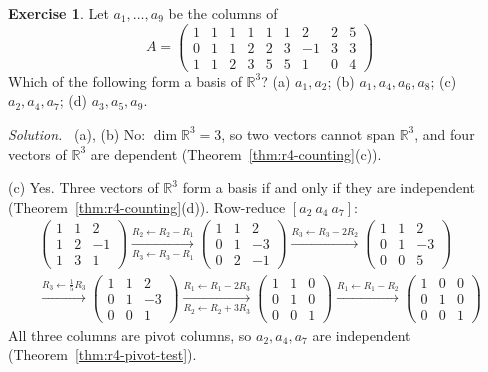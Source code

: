 \documentclass[12pt]{article}
\newcommand{\R}{\mathbb R}
\theoremstyle{definition}
\newtheorem{exercise}{Exercise}
\newenvironment{solution}{\par\noindent\textit{Solution.}\ }{\par\smallskip}
\begin{document}
\begin{exercise}\label{ex:r4-which-bases}
Let \(a_1,\dots,a_9\) be the columns of
\[
A=\begin{pmatrix}1&1&1&1&1&1&2&2&5\\0&1&1&2&2&3&-1&3&3\\1&1&2&3&5&5&1&0&4\end{pmatrix}
\]
Which of the following form a basis of \(\R^3\)? (a) \(a_1,a_2\); (b) \(a_1,a_4,a_6,a_8\);
(c) \(a_2,a_4,a_7\); (d) \(a_3,a_5,a_9\).
\end{exercise}
\begin{solution}
(a), (b) No: \(\dim\R^3=3\), so two vectors cannot span \(\R^3\), and four vectors of \(\R^3\) are
dependent (Theorem~\ref{thm:r4-counting}(c)).

(c) Yes. Three vectors of \(\R^3\) form a basis if and only if they are independent
(Theorem~\ref{thm:r4-counting}(d)). Row-reduce \([a_2\ a_4\ a_7]\):
\[
\begin{gathered}
\begin{pmatrix}1&1&2\\1&2&-1\\1&3&1\end{pmatrix}
\xrightarrow[R_3\leftarrow R_3-R_1]{R_2\leftarrow R_2-R_1}
\begin{pmatrix}1&1&2\\0&1&-3\\0&2&-1\end{pmatrix}
\xrightarrow{R_3\leftarrow R_3-2R_2}
\begin{pmatrix}1&1&2\\0&1&-3\\0&0&5\end{pmatrix}
\\
\xrightarrow{R_3\leftarrow\frac15R_3}
\begin{pmatrix}1&1&2\\0&1&-3\\0&0&1\end{pmatrix}
\xrightarrow[R_2\leftarrow R_2+3R_3]{R_1\leftarrow R_1-2R_3}
\begin{pmatrix}1&1&0\\0&1&0\\0&0&1\end{pmatrix}
\xrightarrow{R_1\leftarrow R_1-R_2}
\begin{pmatrix}1&0&0\\0&1&0\\0&0&1\end{pmatrix}
\end{gathered}
\]
All three columns are pivot columns, so \(a_2,a_4,a_7\) are independent
(Theorem~\ref{thm:r4-pivot-test}).


\end{solution}
\end{document}
